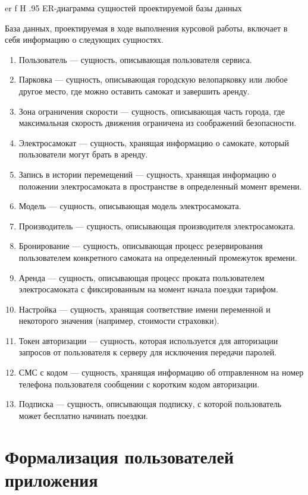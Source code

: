 {er}
{f}
{H}
{.95\textwidth}
{ER-диаграмма сущностей проектируемой базы данных}

База данных, проектируемая в ходе выполнения курсовой работы, включает в себя информацию о следующих сущностях.

\begin{enumerate}
	\item Пользователь --- сущность, описывающая пользователя сервиса.
	\item Парковка --- сущность, описывающая городскую велопарковку или любое другое место, где можно оставить самокат и завершить аренду.
	\item Зона ограничения скорости --- сущность, описывающая часть города, где максимальная скорость движения ограничена из соображений безопасности.
	\item Электросамокат --- сущность, хранящая информацию о самокате, который пользователи могут брать в аренду.
	\item Запись в истории перемещений --- сущность, хранящая информацию о положении электросамоката в пространстве в определенный момент времени.
	\item Модель --- сущность, описывающая модель электросамоката.
	\item Производитель --- сущность, описывающая производителя электросамоката.
	\item Бронирование --- сущность, описывающая процесс резервирования пользователем конкретного самоката на определенный промежуток времени.
	\item Аренда --- сущность, описывающая процесс проката пользователем электросамоката с фиксированным на момент начала поездки тарифом.
	\item Настройка --- сущность, хранящая соответствие имени переменной и некоторого значения (например, стоимости страховки).
	\item Токен авторизации --- сущность, которая используется для авторизации запросов от пользователя к серверу для исключения передачи паролей.
	\item СМС с кодом --- сущность, хранящая информацию об отправленном на номер телефона пользователя сообщении с коротким кодом авторизации.
	\item Подписка --- сущность, описывающая подписку, с которой пользователь может бесплатно начинать поездки.
\end{enumerate}

\section{Формализация пользователей приложения}

